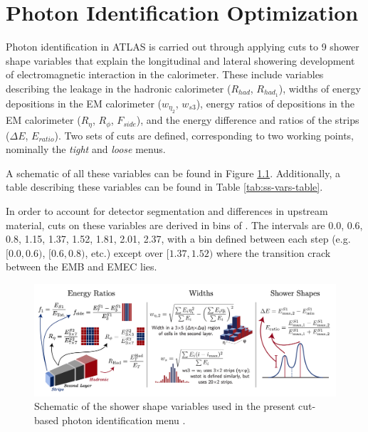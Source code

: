 \chapter{Photon Identification Optimization}

Photon identification in ATLAS is carried out through applying cuts to 9 shower shape variables that explain the longitudinal and lateral showering development of electromagnetic interaction in the calorimeter. These include variables describing the leakage in the hadronic calorimeter ($R_{had}$, $R_{had_1}$), widths of energy depositions in the \gls{EM} calorimeter ($w_{\eta_2}$, $w_{s3}$), energy ratios of depositions in the \gls{EM} calorimeter ($R_{\eta}$, $R_{\phi}$, $F_{side}$), and the energy difference and ratios of the strips ($\Delta E$, $E_{ratio}$). Two sets of cuts are defined, corresponding to two working points, nominally the \textit{tight} and \textit{loose} menus.

A schematic of all these variables can be found in Figure \ref{fig:ss-vars-schematic}. Additionally, a table describing these variables can be found in Table \ref{tab:ss-vars-table}.


In order to account for detector segmentation and differences in upstream material, cuts on these variables are derived in bins of \abseta. The intervals are 0.0, 0.6, 0.8, 1.15, 1.37, 1.52, 1.81, 2.01, 2.37, with a bin defined between each step (e.g. $[0.0,0.6)$, $[0.6,0.8)$, etc.) except over $[1.37,1.52)$ where the transition crack between the \gls{EMB} and \gls{EMEC} lies. 


\begin{figure}[!thp]
    \centering
    \includegraphics[width=.98\textwidth]{chapters/chapter4_photonID/images/ss-vars.png}
    \caption[Schematic of the shower shape variables used in the present cut-based photon identification menu.]
    {Schematic of the shower shape variables used in the present cut-based photon identification menu \cite{ss-var-schematic}.}
    \label{fig:ss-vars-schematic}
\end{figure}

